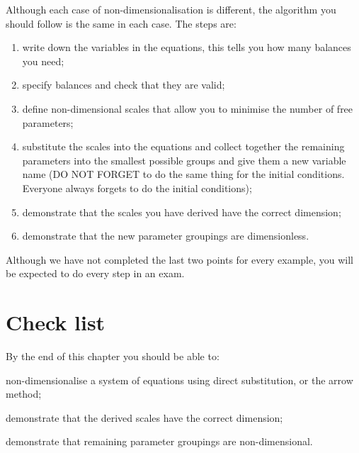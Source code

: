 Although each case of non-dimensionalisation is different, the algorithm you should follow is the same in each case. The steps are:
\begin{enumerate}
\item write down the variables in the equations, this tells you how many balances you need;
\item specify balances and check that they are valid;
\item define non-dimensional scales that allow you to minimise the number of free parameters;
\item substitute the scales into the equations and collect together the remaining parameters into the smallest possible groups and give them a new variable name (DO NOT FORGET to do the same thing for the initial conditions. Everyone always forgets to do the initial conditions);
\item demonstrate that the scales you have derived have the correct dimension;
\item demonstrate that the new parameter groupings are dimensionless.
\end{enumerate}
Although we have not completed the last two points for every example, you will be expected to do every step in an exam.
%
%

\section{Check list}
By the end of this chapter you should be able to:
\begin{todolist}
\item non-dimensionalise a system of equations using direct substitution, or the arrow method;
\item demonstrate that the derived scales have the correct dimension;
\item demonstrate that remaining parameter groupings are non-dimensional.
\end{todolist}





